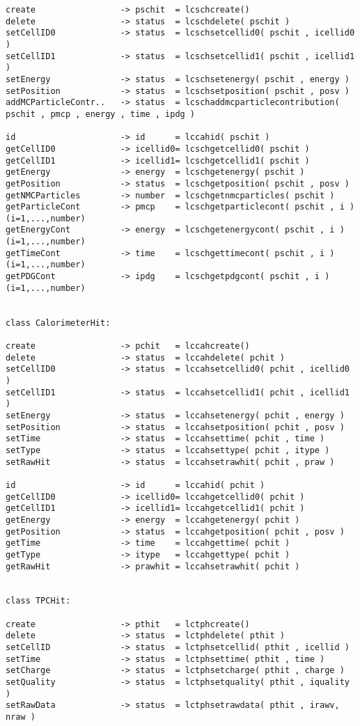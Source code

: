 \begin{scriptsize}
\begin{verbatim}
create                 -> pschit  = lcschcreate()
delete                 -> status  = lcschdelete( pschit )
setCellID0             -> status  = lcschsetcellid0( pschit , icellid0 )
setCellID1             -> status  = lcschsetcellid1( pschit , icellid1 )
setEnergy              -> status  = lcschsetenergy( pschit , energy )
setPosition            -> status  = lcschsetposition( pschit , posv )
addMCParticleContr..   -> status  = lcschaddmcparticlecontribution( pschit , pmcp , energy , time , ipdg )

id                     -> id      = lccahid( pschit )
getCellID0             -> icellid0= lcschgetcellid0( pschit )
getCellID1             -> icellid1= lcschgetcellid1( pschit )
getEnergy              -> energy  = lcschgetenergy( pschit )
getPosition            -> status  = lcschgetposition( pschit , posv )
getNMCParticles        -> number  = lcschgetnmcparticles( pschit )
getParticleCont        -> pmcp    = lcschgetparticlecont( pschit , i ) (i=1,...,number)
getEnergyCont          -> energy  = lcschgetenergycont( pschit , i )   (i=1,...,number)
getTimeCont            -> time    = lcschgettimecont( pschit , i )     (i=1,...,number)
getPDGCont             -> ipdg    = lcschgetpdgcont( pschit , i )      (i=1,...,number)


class CalorimeterHit:

create                 -> pchit   = lccahcreate()
delete                 -> status  = lccahdelete( pchit )
setCellID0             -> status  = lccahsetcellid0( pchit , icellid0 )
setCellID1             -> status  = lccahsetcellid1( pchit , icellid1 )
setEnergy              -> status  = lccahsetenergy( pchit , energy )
setPosition            -> status  = lccahsetposition( pchit , posv )
setTime                -> status  = lccahsettime( pchit , time )
setType                -> status  = lccahsettype( pchit , itype )
setRawHit              -> status  = lccahsetrawhit( pchit , praw )

id                     -> id      = lccahid( pchit )
getCellID0             -> icellid0= lccahgetcellid0( pchit )
getCellID1             -> icellid1= lccahgetcellid1( pchit )
getEnergy              -> energy  = lccahgetenergy( pchit )
getPosition            -> status  = lccahgetposition( pchit , posv )
getTime                -> time    = lccahgettime( pchit )
getType                -> itype   = lccahgettype( pchit )
getRawHit              -> prawhit = lccahsetrawhit( pchit )


class TPCHit:

create                 -> pthit   = lctphcreate()
delete                 -> status  = lctphdelete( pthit )
setCellID              -> status  = lctphsetcellid( pthit , icellid )
setTime                -> status  = lctphsettime( pthit , time )
setCharge              -> status  = lctphsetcharge( pthit , charge )
setQuality             -> status  = lctphsetquality( pthit , iquality )
setRawData             -> status  = lctphsetrawdata( pthit , irawv, nraw )


\end{verbatim}
\end{scriptsize}
